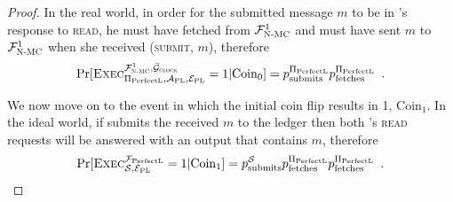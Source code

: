 \begin{proof}
    In the real world, in order for the submitted message $m$ to be in \bob's
    response to \textsc{read}, he must have fetched from $\mathcal{F}_{\textsc{N-MC}}^1$ and
    \alice{} must have sent $m$ to $\mathcal{F}_{\textsc{N-MC}}^1$ when she received
    (\textsc{submit}, $m$), therefore
    \begin{equation}
    \label{eq:coin0:real}
      \Pr[\textsc{Exec}^{\FnetworkEd^1, \gFclock}_{\perfectprot, \perfectadv,
      \perfectenv} = 1 | \mathrm{Coin}_0] = \ppsubmits \ppfetches \enspace.
    \end{equation}

    We now move on to the event in which the initial coin flip results in 1,
    $\mathrm{Coin}_1$. In the ideal world, if \simulator{} submits the received
    $m$ to the ledger then both \environment's \textsc{read} requests will be
    answered with an output that contains $m$, therefore
    \begin{equation}
    \label{eq:coin1:ideal}
      \Pr[\textsc{Exec}^{\perfectledger}_{\simulator, \perfectenv} = 1 |
      \mathrm{Coin}_1] = \pssubmits \ppfetches \ppfetches \enspace.
    \end{equation}
  \end{proof}
